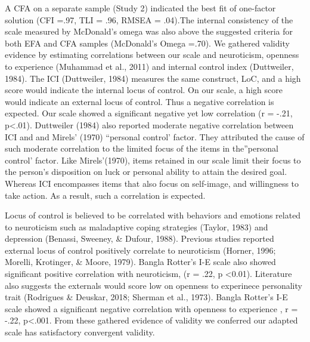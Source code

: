 \documentclass[
  english,
  man]{apa6}
\begin{document}
A CFA on a separate sample (Study 2) indicated the best fit of one-factor solution (CFI =.97, TLI = .96, RMSEA = .04).The internal consistency of the scale measured by McDonald's omega was also above the suggested criteria for both EFA and CFA samples (McDonald's Omega =.70). We gathered validity evidence by estimating correlations between our scale and neuroticism, openness to experience (Muhammad et al., 2011) and internal control index (Duttweiler, 1984). The ICI (Duttweiler, 1984) measures the same construct, LoC, and a high score would indicate the internal locus of control. On our scale, a high score would indicate an external locus of control. Thus a negative correlation is expected. Our scale showed a significant negative yet low correlation (r = -.21, p\textless.01). Duttweiler (1984) also reported moderate negative correlation between ICI and and Mirels' (1970) ``personal control' factor. They attributed the cause of such moderate correlation to the limited focus of the items in the''personal control' factor. Like Mirels'(1970), items retained in our scale limit their focus to the person's disposition on luck or personal ability to attain the desired goal. Whereas ICI encompasses items that also focus on self-image, and willingness to take action. As a result, such a correlation is expected.

Locus of control is believed to be correlated with behaviors and emotions related to neuroticism such as maladaptive coping strategies (Taylor, 1983) and depression (Benassi, Sweeney, \& Dufour, 1988). Previous studies reported external locus of control positively correlate to neuroticism (Horner, 1996; Morelli, Krotinger, \& Moore, 1979). Bangla Rotter's I-E scale also showed significant positive correlation with neuroticism, (r = .22, p \textless0.01). Literature also suggests the externals would score low on openness to experinece personality trait (Rodrigues \& Deuskar, 2018; Sherman et al., 1973). Bangla Rotter's I-E scale showed a significant negative correlation with openness to experience , r = -.22, p\textless.001. From these gathered evidence of validity we conferred our adapted scale has satisfactory convergent validity.
\end{document}
